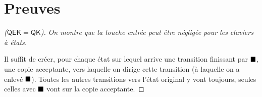 \documentclass[12pt, a4paper]{article}
\begin{document}
    \section{Preuves}
    \begin{proof}[($\mathsf{QEK} = \mathsf{QK}$)]
        \emph{On montre que la touche entrée peut être négligée pour les claviers à états.} 

        Il suffit de créer, pour chaque état sur lequel arrive une transition finissant par $\mathord{\blacksquare}$, une copie acceptante, vers laquelle on dirige cette transition (à laquelle on a enlevé $\mathord{\blacksquare}$).
        Toutes les autres transitions vers l'état original y vont toujours, seules celles avec $\mathord{\blacksquare}$ vont sur la copie acceptante. \medskip

    \end{proof}
\end{document}
